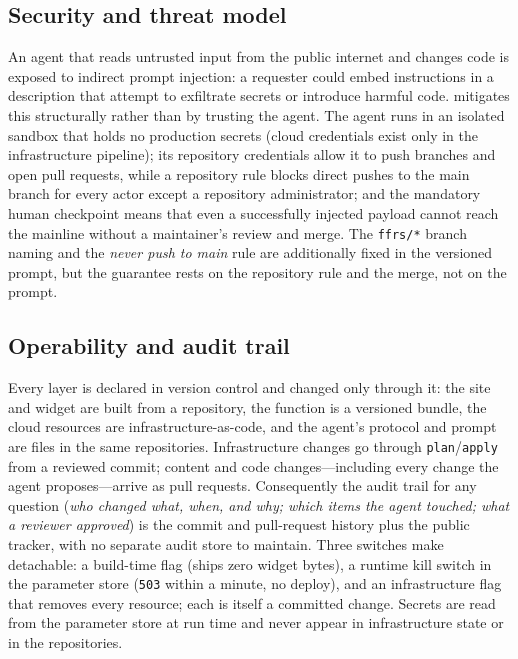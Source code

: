 \subsection{Security and threat model}
An agent that reads untrusted input from the public internet and changes code is exposed to indirect prompt injection: a requester could embed instructions in a description that attempt to exfiltrate secrets or introduce harmful code. \ffrs{} mitigates this structurally rather than by trusting the agent. The agent runs in an isolated sandbox that holds no production secrets (cloud credentials exist only in the infrastructure pipeline); its repository credentials allow it to push branches and open pull requests, while a repository rule blocks direct pushes to the main branch for every actor except a repository administrator; and the mandatory human checkpoint means that even a successfully injected payload cannot reach the mainline without a maintainer's review and merge. The \texttt{ffrs/*} branch naming and the \emph{never push to main} rule are additionally fixed in the versioned prompt, but the guarantee rests on the repository rule and the merge, not on the prompt.


\subsection{Operability and audit trail}
Every layer is declared in version control and changed only through it: the site and widget are built from a repository, the function is a versioned bundle, the cloud resources are infrastructure-as-code, and the agent's protocol and prompt are files in the same repositories. Infrastructure changes go through \texttt{plan}/\texttt{apply} from a reviewed commit; content and code changes---including every change the agent proposes---arrive as pull requests. Consequently the audit trail for any question (\emph{who changed what, when, and why; which items the agent touched; what a reviewer approved}) is the commit and pull-request history plus the public tracker, with no separate audit store to maintain. Three switches make \ffrs{} detachable: a build-time flag (ships zero widget bytes), a runtime kill switch in the parameter store (\texttt{503} within a minute, no deploy), and an infrastructure flag that removes every resource; each is itself a committed change. Secrets are read from the parameter store at run time and never appear in infrastructure state or in the repositories.
